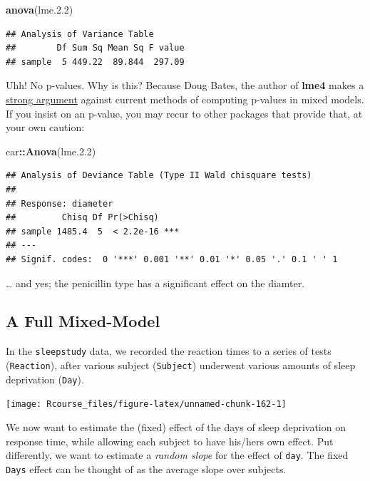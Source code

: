 \documentclass[]{book}
\newenvironment{Shaded}{\begin{snugshade}}{\end{snugshade}}
\newcommand{\KeywordTok}[1]{\textcolor[rgb]{0.13,0.29,0.53}{\textbf{#1}}}
\newcommand{\FloatTok}[1]{\textcolor[rgb]{0.00,0.00,0.81}{#1}}
\newcommand{\OperatorTok}[1]{\textcolor[rgb]{0.81,0.36,0.00}{\textbf{#1}}}
\newcommand{\NormalTok}[1]{#1}
\theoremstyle{definition}
\theoremstyle{definition}
\theoremstyle{definition}
\theoremstyle{remark}
\begin{document}
\begin{Shaded}
\begin{Highlighting}[]
\KeywordTok{anova}\NormalTok{(lme.}\FloatTok{2.2}\NormalTok{)}
\end{Highlighting}
\end{Shaded}

\begin{verbatim}
## Analysis of Variance Table
##        Df Sum Sq Mean Sq F value
## sample  5 449.22  89.844  297.09
\end{verbatim}

Uhh! No p-values. Why is this? Because Doug Bates, the author of
\textbf{lme4} makes a
\href{https://stat.ethz.ch/pipermail/r-help/2006-May/094765.html}{strong
argument} against current methods of computing p-values in mixed models.
If you insist on an p-value, you may recur to other packages that
provide that, at your own caution:

\begin{Shaded}
\begin{Highlighting}[]
\NormalTok{car}\OperatorTok{::}\KeywordTok{Anova}\NormalTok{(lme.}\FloatTok{2.2}\NormalTok{) }
\end{Highlighting}
\end{Shaded}

\begin{verbatim}
## Analysis of Deviance Table (Type II Wald chisquare tests)
## 
## Response: diameter
##         Chisq Df Pr(>Chisq)    
## sample 1485.4  5  < 2.2e-16 ***
## ---
## Signif. codes:  0 '***' 0.001 '**' 0.01 '*' 0.05 '.' 0.1 ' ' 1
\end{verbatim}

\ldots{} and yes; the penicillin type has a significant effect on the
diamter.

\subsection{A Full Mixed-Model}\label{a-full-mixed-model}

In the \texttt{sleepstudy} data, we recorded the reaction times to a
series of tests (\texttt{Reaction}), after various subject
(\texttt{Subject}) underwent various amounts of sleep deprivation
(\texttt{Day}).

\texttt{[image: Rcourse\_files/figure-latex/unnamed-chunk-162-1]}

We now want to estimate the (fixed) effect of the days of sleep
deprivation on response time, while allowing each subject to have
his/hers own effect. Put differently, we want to estimate a \emph{random
slope} for the effect of \texttt{day}. The fixed \texttt{Days} effect
can be thought of as the average slope over subjects.
\end{document}
